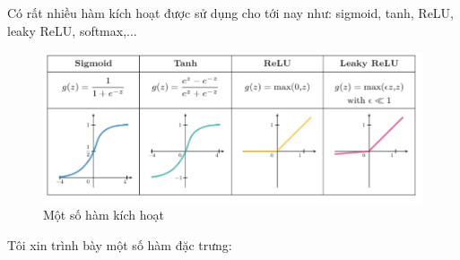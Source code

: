 Có rất nhiều hàm kích hoạt được sử dụng cho tới nay như: sigmoid, tanh, ReLU, leaky ReLU, softmax,...
\begin{figure}[H]
\begin{center}
\includegraphics[scale=0.8]{chap3/image/activation.png}
\caption[]{Một số hàm kích hoạt \protect\footnotemark}
\end{center}
\end{figure}
\begin{flushleft}
Tôi xin trình bày một số hàm đặc trưng:
\end{flushleft}
